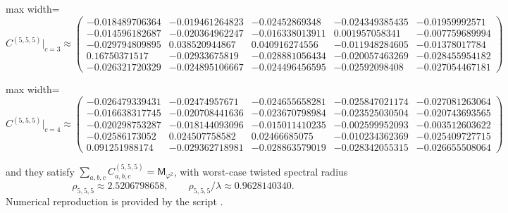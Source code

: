 \begin{center}
\begin{adjustbox}{max width=\linewidth}
\(
C^{(5,5,5)}\big|_{c=3}\approx
\begin{pmatrix}
-0.018489706364 & -0.019461264823 & -0.02452869348 & -0.024349385435 & -0.01959992571\\
-0.014596182687 & -0.020364962247 & -0.016338013911 & 0.001957058341 & -0.007759689994\\
-0.029794809895 & 0.038520944867 & 0.040916274556 & -0.011948284605 & -0.01378017784\\
0.16750371517 & -0.02933675819 & -0.028881056434 & -0.020057463269 & -0.028455954182\\
-0.026321720329 & -0.024895106667 & -0.024496456595 & -0.02592098408 & -0.027054467181
\end{pmatrix}
\)
\end{adjustbox}
\end{center}
\begin{center}
\begin{adjustbox}{max width=\linewidth}
\(
C^{(5,5,5)}\big|_{c=4}\approx
\begin{pmatrix}
-0.026479339431 & -0.02474957671 & -0.024655658281 & -0.025847021174 & -0.027081263064\\
-0.016638317745 & -0.020708441636 & -0.023670798984 & -0.023525030504 & -0.020743693565\\
-0.020298753287 & -0.018144093096 & -0.015011410235 & -0.002599952093 & -0.003512603622\\
-0.02586173052 & 0.024507758582 & 0.02466685075 & -0.010234362369 & -0.025409727715\\
0.091251988174 & -0.029362718981 & -0.028863579019 & -0.028342055315 & -0.026655508064
\end{pmatrix}
\)
\end{adjustbox}
\end{center}
and they satisfy $\sum_{a,b,c}C_{a,b,c}^{(5,5,5)}=\mathsf{M}_{\varphi^2}$, with worst-case twisted spectral radius
\[
\rho_{5,5,5}\approx 2.5206798658,\qquad \rho_{5,5,5}/\lambda\approx 0.9628140340.
\]
Numerical reproduction is provided by the script .

